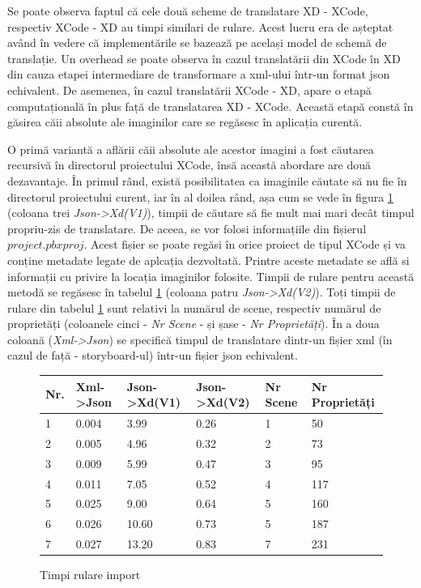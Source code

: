 Se poate observa faptul că cele două scheme de translatare XD - XCode, respectiv XCode - XD au timpi similari de rulare. Acest lucru era de așteptat având în vedere că implementările se bazează pe același model de schemă de translație. Un overhead se poate observa în cazul translatării din XCode în XD din cauza etapei intermediare de transformare a xml-ului într-un format json echivalent. De asemenea, în cazul translatării XCode - XD, apare o etapă computațională în plus față de translatarea XD - XCode. Această etapă constă în găsirea căii absolute ale imaginilor care se regăsesc în aplicația curentă. 

O primă variantă a aflării căii absolute ale acestor imagini a fost căutarea recursivă în directorul proiectului XCode, însă această abordare are două dezavantaje. În primul rând, există posibilitatea ca imaginile căutate să nu fie în directorul proiectului curent, iar în al doilea rând, așa cum se vede în figura \ref{fig:Tabimport} (coloana trei \textit{Json->Xd(V1)}), timpii de căutare să fie mult mai mari decât timpul propriu-zis de translatare. De aceea, se vor folosi informațiile din fișierul $project.pbxproj$. Acest fișier se poate regăsi în orice proiect de tipul XCode și va conține metadate legate de aplcația dezvoltată. Printre aceste metadate se află si informații cu privire la locația imaginilor folosite. Timpii de rulare pentru această metodă se regăsesc în tabelul \ref{fig:Tabimport} (coloana patru \textit{Json->Xd(V2)}). Toți timpii de rulare din tabelul \ref{fig:Tabimport} sunt relativi la numărul de scene, respectiv numărul de proprietăți (coloanele cinci - \textit{Nr Scene} - și șase - \textit{Nr Proprietăți}). În a doua coloană (\textit{Xml->Json}) se specifică timpul de translatare dintr-un fișier xml (în cazul de față - storyboard-ul) într-un fișier json echivalent.

\begin{figure}[!htbp]
\centering
\begin{center}
    \begin{tabular}{| l | l | l | l |l |l |}
    \hline
    Nr. & Xml->Json & Json->Xd(V1) & Json->Xd(V2) & Nr Scene & Nr Proprietăți\\ \hline
    1 & 0.004 & 3.99 & 0.26 & 1 & 50\\ \hline
    2 & 0.005 & 4.96 & 0.32 & 2 & 73\\ \hline
    3 & 0.009 & 5.99 & 0.47 & 3 & 95\\ \hline
    4 & 0.011 & 7.05 & 0.52 & 4 & 117\\ \hline
    5 & 0.025 & 9.00 & 0.64 & 5 & 160\\ \hline
    6 & 0.026 & 10.60 & 0.73 & 5 & 187\\ \hline
    7 & 0.027 & 13.20 & 0.83 & 7 & 231\\ \hline
    \end{tabular}
\end{center}
\caption{Timpi rulare import} \label{fig:Tabimport}
\end{figure}

